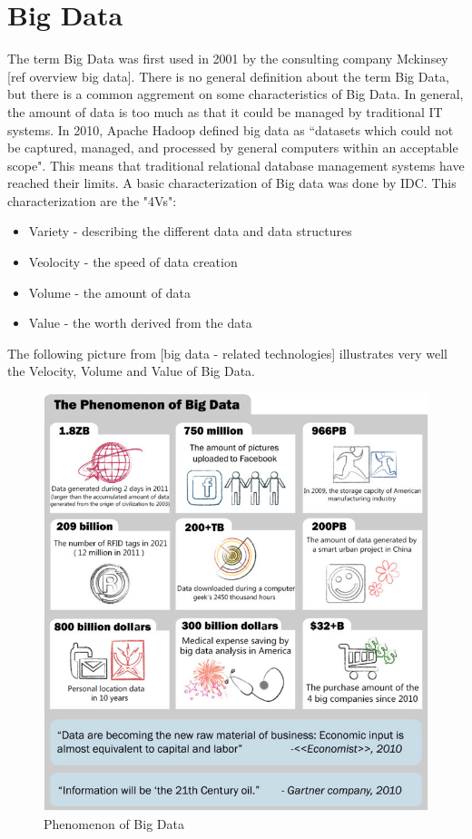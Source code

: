\documentclass{acm_proc_article-sp}
\begin{document}
\section{Big Data}

The term Big Data was first used in 2001 by the consulting company Mckinsey [ref overview big data]. There is no general definition about the term Big Data, but there is a common aggrement on some characteristics of Big Data. In general, the amount of data is too much as that it could be managed by traditional IT systems.
In 2010, Apache Hadoop defined big data as “datasets which could not be
captured, managed, and processed by general computers within an acceptable
scope". This means that traditional relational database management systems have reached their limits.
A basic characterization of Big data was done by IDC. This characterization are the "4Vs":
\begin{itemize}
	\item Variety - describing the different data and data structures
	\item Veolocity - the speed of data creation
	\item Volume - the amount of data
	\item Value - the worth derived from the data
\end{itemize}

The following picture from [big data - related technologies] illustrates very well the Velocity, Volume and Value of Big Data.

\begin{figure}[hbtp]
	\centering
	\includegraphics[scale=0.45]{big_data.png}
	\caption{Phenomenon of Big Data}
\end{figure}
\end{document}

